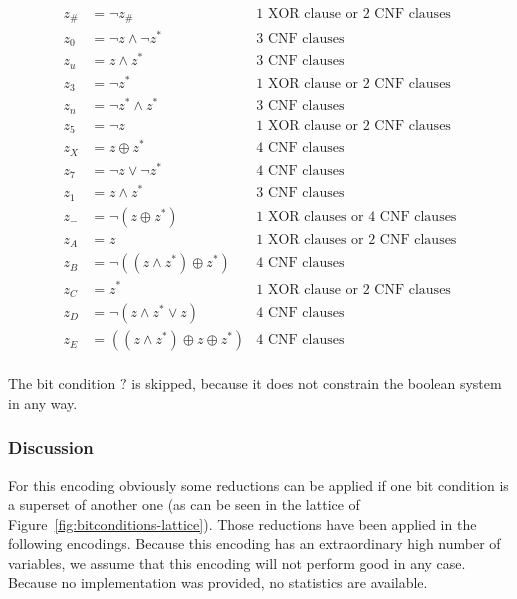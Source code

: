 \begin{align*}
  z_\# & = \neg z_\#                          & \text{1 XOR clause or 2 CNF clauses} \\
  z_0  & = \neg z \land \neg z^*              & \text{3 CNF clauses} \\
  z_u  & = z \land z^*                        & \text{3 CNF clauses} \\
  z_3  & = \neg z^*                           & \text{1 XOR clause or 2 CNF clauses} \\
  z_n  & = \neg z^* \land z^*                 & \text{3 CNF clauses} \\
  z_5  & = \neg z                             & \text{1 XOR clause or 2 CNF clauses} \\
  z_X  & = z \oplus z^*                       & \text{4 CNF clauses} \\
  z_7  & = \neg z \lor \neg z^*               & \text{4 CNF clauses} \\
  z_1  & = z \land z^*                        & \text{3 CNF clauses} \\
  z_-  & = \neg(z \oplus z^*)                 & \text{1 XOR clauses or 4 CNF clauses} \\
  z_A  & = z                                  & \text{1 XOR clauses or 2 CNF clauses} \\
  z_B  & = \neg((z \land z^*) \oplus z^*)     & \text{4 CNF clauses} \\
  z_C  & = z^*                                & \text{1 XOR clause or 2 CNF clauses} \\
  z_D  & = \neg(z \land z^* \lor z)           & \text{4 CNF clauses} \\
  z_E  & = ((z\land z^*) \oplus z \oplus z^*) & \text{4 CNF clauses} \\
\end{align*}

The bit condition $?$ is skipped, because it does not constrain the boolean system in any way.

\subsubsection{Discussion}
\label{sec:exhaustive-discussion}
%
For this encoding obviously some reductions can be applied if one bit condition is a superset of another one (as can be seen in the lattice of Figure~\ref{fig:bitconditions-lattice}). Those reductions have been applied in the following encodings. Because this encoding has an extraordinary high number of variables, we assume that this encoding will not perform good in any case. Because no implementation was provided, no statistics are available.

